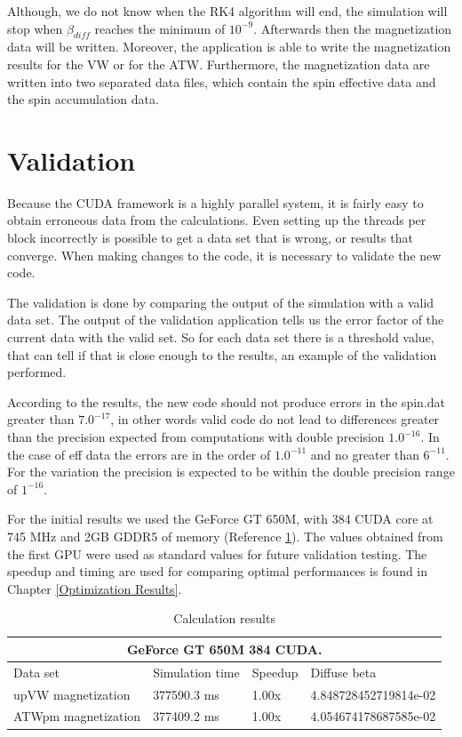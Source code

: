 Although, we do not know when the RK4 algorithm will end, the simulation will stop when $\beta_{diff}$ reaches the minimum of $10^{-9}$. Afterwards then the magnetization data will be written. Moreover, the application is able to write the magnetization results for the VW or for the ATW. Furthermore, the magnetization data are written into two separated data files, which contain the spin effective data and the spin accumulation data.

\section{Validation}

Because the CUDA framework is a highly parallel system, it is fairly easy to obtain erroneous data from the calculations. Even setting up the threads per block incorrectly is possible to get a data set that is wrong, or results that converge. When making changes to the code, it is necessary to validate the new code.

The validation is done by comparing the output of the simulation with a valid data set. The output of the validation application tells us the error factor of the current data with the valid set. So for each data set there is a threshold value, that can tell if that is close enough to the results, an example of the validation performed.

According to the results, the new code should not produce errors in the spin.dat greater than $7.0^{-17}$, in other words valid code do not lead to differences greater than the precision expected from computations with double precision $1.0^{-16}$. In the case of eff data the errors are in the order of $1.0^{-11}$ and no greater than $6^{-11}$. For the variation the precision is expected to be within the double precision range of $1^{-16}$. 

For the initial results we used the GeForce GT 650M, with 384 CUDA core at 745 MHz and 2GB GDDR5 of memory (Reference \ref{tab:results}). The values obtained from the first GPU were used as standard values for future validation testing. The speedup and timing are used for comparing optimal performances is found in Chapter \ref{Optimization Results}.

\begin{table}[h]
\centering
\begin{tabular}{| l | l | l | l |}
\hline
\multicolumn{4}{|c|}{GeForce GT 650M  384 CUDA.} \\
\hline
Data set & Simulation time & Speedup & Diffuse beta  \\
\hline
upVW magnetization & 377590.3 ms & 1.00x & 4.848728452719814e-02 \\
\hline
ATWpm magnetization & 377409.2 ms & 1.00x & 4.054674178687585e-02 \\
\hline
\end{tabular}
\caption{Calculation results}
\label{tab:results}
\end{table}


